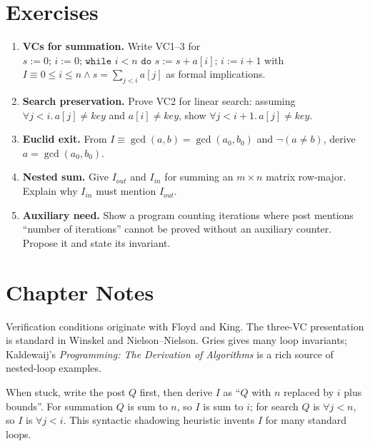 \section{Exercises}
\label{sec:ch04-exercises}
\begin{enumerate}[label=E4.\arabic*, leftmargin=*, itemsep=0.6em]
    \item \textbf{VCs for summation.} Write VC1--3 for $s:=0;\,i:=0;\,\texttt{while }i<n\texttt{ do }s:=s+a[i];\,i:=i+1$ with $I\equiv0\le i\le n\land s=\sum_{j<i}a[j]$ as formal implications.
    \item \textbf{Search preservation.} Prove VC2 for linear search: assuming $\forall j<i.\,a[j]\neq key$ and $a[i]\neq key$, show $\forall j<i+1.\,a[j]\neq key$.
    \item \textbf{Euclid exit.} From $I\equiv\gcd(a,b)=\gcd(a_0,b_0)$ and $\neg(a\neq b)$, derive $a=\gcd(a_0,b_0)$.
    \item \textbf{Nested sum.} Give $I_{out}$ and $I_{in}$ for summing an $m\times n$ matrix row-major. Explain why $I_{in}$ must mention $I_{out}$.
    \item \textbf{Auxiliary need.} Show a program counting iterations where post mentions ``number of iterations'' cannot be proved without an auxiliary counter. Propose it and state its invariant.
\end{enumerate}

\section*{Chapter Notes}
Verification conditions originate with Floyd and King. The three-VC presentation is standard in Winskel and Nielson--Nielson. Gries gives many loop invariants; Kaldewaij's \emph{Programming: The Derivation of Algorithms} is a rich source of nested-loop examples.

\smallskip
\begin{remark}[Workflow]
When stuck, write the post $Q$ first, then derive $I$ as ``$Q$ with $n$ replaced by $i$ plus bounds''. For summation $Q$ is sum to $n$, so $I$ is sum to $i$; for search $Q$ is $\forall j<n$, so $I$ is $\forall j<i$. This syntactic shadowing heuristic invents $I$ for many standard loops.
\end{remark}

\smallskip
